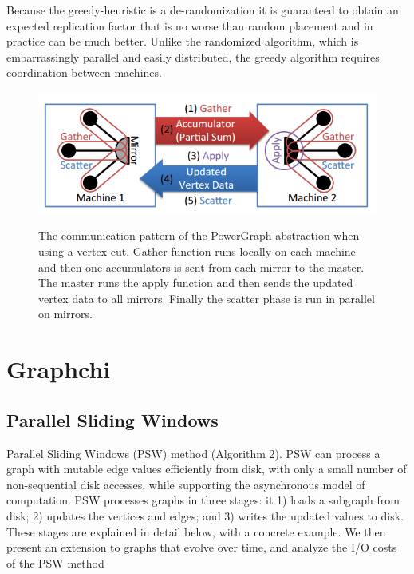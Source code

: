 \documentclass {article}
\begin{document}
Because the greedy-heuristic is a de-randomization it is
guaranteed to obtain an expected replication factor that is
no worse than random placement and in practice can be
much better. Unlike the randomized algorithm, which is
embarrassingly parallel and easily distributed, the greedy
algorithm requires coordination between machines. 

\begin{figure}
  \centering
  \includegraphics[width=\textwidth]{vertex_cut.png}\\
  \caption{The communication pattern of the PowerGraph abstraction when using a vertex-cut. Gather function runs locally on each machine and then one accumulators is sent from each
  mirror to the master. The master runs the apply function and
  then sends the updated vertex data to all mirrors. Finally the
  scatter phase is run in parallel on mirrors.}\label{vertex_cut}
\end{figure}



\section{Graphchi}
\subsection{Parallel Sliding Windows}

Parallel Sliding Windows (PSW)
method (Algorithm 2). PSW can process a graph with
mutable edge values efficiently from disk, with only a small
number of non-sequential disk accesses, while supporting
the asynchronous model of computation. PSW processes
graphs in three stages: it 1) loads a subgraph from disk; 2)
updates the vertices and edges; and 3) writes the updated
values to disk. These stages are explained in detail below,
with a concrete example. We then present an extension to
graphs that evolve over time, and analyze the I/O costs of
the PSW method
\end{document}
